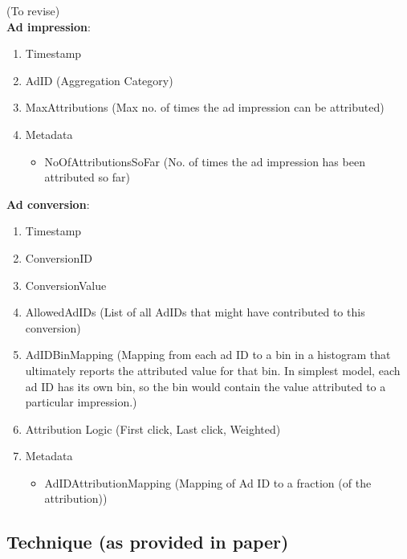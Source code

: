 (To revise) \\

\textbf{Ad impression}: 
\begin{enumerate}
    \item Timestamp
    \item AdID (Aggregation Category) 
    \item MaxAttributions (Max no. of times the ad impression can be attributed)
    \item Metadata
    \begin{itemize}
        \item NoOfAttributionsSoFar (No. of times the ad impression has been attributed so far)
    \end{itemize}
\end{enumerate}

\textbf{Ad conversion}:
\begin{enumerate}
    \item Timestamp
    \item ConversionID
    \item ConversionValue
    \item AllowedAdIDs (List of all AdIDs that might have contributed to this conversion)
    \item AdIDBinMapping (Mapping from each ad ID to a bin in a histogram that ultimately reports the attributed value for that bin. In simplest model, each ad ID has its own bin, so the bin would contain the value attributed to a particular impression.)
    \item Attribution Logic (First click, Last click, Weighted) 
    \item Metadata
    \begin{itemize}
        \item AdIDAttributionMapping (Mapping of Ad ID to a fraction (of the attribution))  
    \end{itemize}
\end{enumerate}

\subsection{Technique (as provided in paper)}

